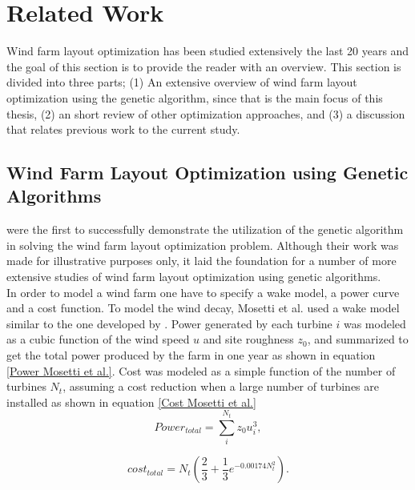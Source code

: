 \chapter{Related Work}
Wind farm layout optimization has been studied extensively the last 20 years and the goal of this section is to provide the reader with an overview. This section is divided into three parts; (1) An extensive overview of wind farm layout optimization using the genetic algorithm, since that is the main focus of this thesis, (2) an short review of other optimization approaches, and (3) a discussion that relates previous work to the current study. 


\section{Wind Farm Layout Optimization using Genetic Algorithms}


\cite{Mosetti} were the first to successfully demonstrate the utilization of the genetic algorithm in solving the wind farm layout optimization problem. Although their work was made for illustrative purposes only, it laid the foundation for a number of more extensive studies of wind farm layout optimization using genetic algorithms.\\

\noindent In order to model a wind farm one have to specify a wake model, a power curve and a cost function. To model the wind decay, Mosetti et al. used a wake model similar to the one developed by \cite{Jensen}. Power generated by each turbine $i$ was modeled as a cubic function of the wind speed $u$ and site roughness $z_0$, and summarized to get the total power produced by the farm in one year as shown in equation \ref{Power Mosetti et al.}. Cost was modeled as a simple function of the number of turbines $N_t$, assuming a cost reduction when a large number of turbines are installed as shown in equation \ref{Cost Mosetti et al.} \\


\begin{equation}
\label{Power Mosetti et al.}
Power_{total} = \sum^{N_t}_{i} z_0u_i^3,
\end{equation}


\begin{equation}
\label{Cost Mosetti et al.}
cost_{total} = N_t \left( \frac{2}{3} + \frac{1}{3}e^{-0.00174N_t^2} \right).
\end{equation}

